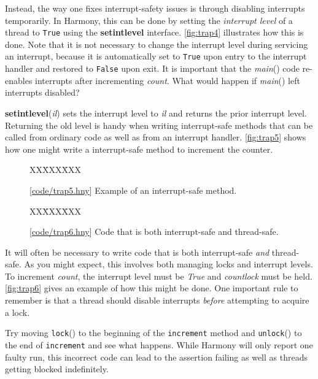 \documentclass{report}
\newcommand{\harmonysource}[1]{
\begin{tabbing}
XX\=XXX\=XXX\kill
    
\end{tabbing}
}
\newcommand{\harmonylink}[1]{%
[\href{https://harmony.cs.cornell.edu/#1}{\underline{#1}}]%
}
\newenvironment{code}{
\tcolorbox
}{
\endtcolorbox
}
\begin{document}
Instead, the way one fixes interrupt-safety issues is through disabling interrupts
temporarily.  In Harmony, this can be done by setting the \textit{interrupt level}
of a thread to \texttt{True} using the \textbf{setintlevel} interface.
\autoref{fig:trap4} illustrates how this is done.
Note that it is not necessary to change the interrupt level during servicing an
interrupt, because it is automatically set to \texttt{True} upon entry to the interrupt
handler and restored to \texttt{False} upon exit.
It is important that the \textit{main}() code re-enables interrupts after incrementing
\textit{count}.  What would happen if \textit{main}() left interrupts disabled?

\textbf{setintlevel}(\textit{il}) sets the interrupt level to \textit{il} and returns
the prior interrupt level.  Returning the old level is handy when writing interrupt-safe
methods that can be called from ordinary code as well as from an interrupt handler.
\autoref{fig:trap5} shows how one might write a interrupt-safe method
to increment the counter.

\begin{figure}
\begin{code}
\harmonysource{trap5}
\end{code}
\caption{\harmonylink{code/trap5.hny} Example of an interrupt-safe method.}
\label{fig:trap5}
\end{figure}

\begin{figure}
\begin{code}
\harmonysource{trap6}
\end{code}
\caption{\harmonylink{code/trap6.hny} Code that is both interrupt-safe and thread-safe.}
\label{fig:trap6}
\end{figure}

It will often be necessary to write code that is both interrupt-safe \emph{and}
thread-safe.  As you might expect, this involves both managing locks and
interrupt levels.
To increment \textit{count}, the interrupt level must be \textit{True} and
\textit{countlock} must be held.
\autoref{fig:trap6} gives an example of how this might be done.
One important rule to remember is that a thread should disable interrupts \emph{before}
attempting to acquire a lock.

Try moving \texttt{lock}() to the beginning of the \texttt{increment} method
and \texttt{unlock}() to the end of \texttt{increment} and see what happens.
While Harmony will only report one faulty run, this incorrect code can lead to
the assertion failing as well as threads getting blocked indefinitely.
\end{document}
